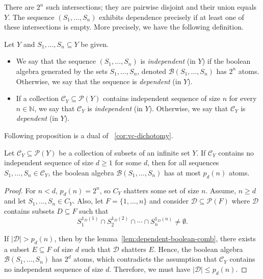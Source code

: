 There are \(2^n\) such intersections; they are pairwise disjoint and their union equals \(Y\). The sequence \((S_1,\dots,S_n)\) exhibits dependence precisely if at least one of these intersections is empty. More precisely, we have the following definition.


\begin{definition}
    Let $Y$ and $S_1, \ldots, S_n \subseteq Y$ be given.
    \begin{itemize}
        \item We say that the sequence $(S_1,  \ldots, S_n)$ is \emph{independent} (in $Y$) if the boolean algebra generated by the sets $S_1, \ldots, S_n$, denoted $\mathcal{B}(S_1, \ldots, S_n)$ has $2^n$ atoms. Otherwise, we say that the sequence is \emph{dependent} (in $Y$).

        \item If a collection $\mathcal{C}_Y \subseteq \mathcal{P}(Y)$ contains independent sequence of size $n$ for every $n \in \mathbb{N}$, we say that $\mathcal{C}_Y$ is \emph{independent} (in $Y$). Otherwise, we say that $\mathcal{C}_Y$ is \emph{dependent} (in $Y$).
    \end{itemize}
\end{definition}

Following proposition is a dual of ~\ref{cor:vc-dichotomy}.

\begin{proposition}{\label{prop:number-of-atoms}}
    Let $\mathcal{C}_Y \subseteq \mathcal{P}(Y)$ be a collection of subsets of an infinite set $Y$. If $\mathcal{C}_Y$ contains no independent sequence of size $d \ge 1$ for some $d$, then for all sequences $S_1, \ldots, S_n \in \mathcal{C}_Y$, the boolean algebra $\mathcal{B}(S_1, \dots, S_n)$ has at most $p_d(n)$ atoms.
\end{proposition}

\begin{proof}

    For $n < d$, $p_d(n) = 2^n$, so $C_Y$ shatters some set of size $n$. Assume, $n \geq d$ and let $S_1, \dots, S_n \in C_Y$. Also, let $F = \{1, \ldots, n\}$ and consider $\mathcal{D} \subseteq \mathcal{P}(F)$ where $\mathcal{D}$ contains subsets $D \subseteq F$ such that
    \[
        S_1^{\mathds{1}_D(1)} \cap S_2^{\mathds{1}_D(2)} \cap \cdots \cap S_n^{\mathds{1}_D(n)} \neq \emptyset.
    \]

    If $|\mathcal{D}| > p_d(n)$, then by the lemma~\ref{lem:dependent-boolean-comb}, there exists a subset $E \subseteq F$ of size $d$ such that $\mathcal{D}$ shatters $E$. Hence, the boolean algebra $\mathcal{B}(S_1, \dots, S_n)$ has $2^d$ atoms, which contradicts the assumption that $\mathcal{C}_Y$ contains no independent sequence of size $d$. Therefore, we must have $|\mathcal{D}| \leq p_d(n)$.
\end{proof}

